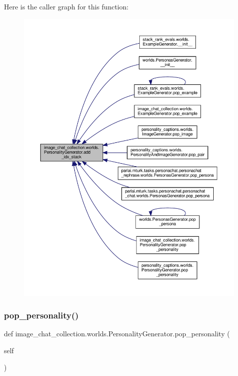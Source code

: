 Here is the caller graph for this function\+:
\nopagebreak
\begin{figure}[H]
\begin{center}
\leavevmode
\includegraphics[width=350pt]{classimage__chat__collection_1_1worlds_1_1PersonalityGenerator_a53113dc205f282b68fb601bb4f1b094e_icgraph}
\end{center}
\end{figure}
\mbox{\label{classimage__chat__collection_1_1worlds_1_1PersonalityGenerator_ad35601df7a905c1e043c6fb1117db74e}} 
\subsubsection{\texorpdfstring{pop\+\_\+personality()}{pop\_personality()}}
{\footnotesize\ttfamily def image\+\_\+chat\+\_\+collection.\+worlds.\+Personality\+Generator.\+pop\+\_\+personality (\begin{DoxyParamCaption}\item[{}]{self }\end{DoxyParamCaption})}



